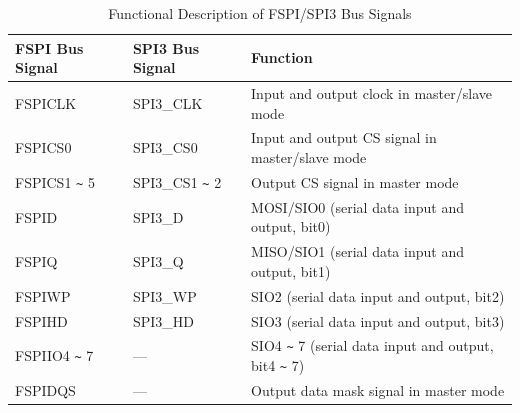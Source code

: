 \documentclass[main\_\_EN.tex]{subfiles}
\begin{document}
\begin{ThreePartTable}


\begin{longtable}[c]{|l|l|l|}
\caption{Functional Description of FSPI/SPI3 Bus Signals}
\label{table:SPI_signals}\\
\hline
    \rowcolor{lightgray}
    \textbf{FSPI Bus Signal}& \textbf{SPI3 Bus Signal}& \textbf{Function} \\
    \hline
    \endfirsthead

    \endlastfoot
    FSPICLK     & SPI3\_CLK     & Input and output clock in master/slave mode \\\hline
    FSPICS0     & SPI3\_CS0     & Input and output CS signal in master/slave mode \\\hline
    FSPICS1  \verb+~+ 5 & SPI3\_CS1 \verb+~+ 2  & Output CS signal in master mode\\\hline
    FSPID       & SPI3\_D       & MOSI/SIO0 (serial data input and output, bit0)\\
    \hline
    FSPIQ       & SPI3\_Q       & MISO/SIO1 (serial data input and output, bit1) \\\hline
    FSPIWP      & SPI3\_WP      & SIO2 (serial data input and output, bit2) \\\hline
    FSPIHD      & SPI3\_HD      & SIO3 (serial data input and output, bit3) \\\hline
    FSPIIO4 \verb+~+ 7 &    ---   & SIO4 \verb+~+ 7 (serial data input and output, bit4 \verb+~+ 7) \\\hline
    FSPIDQS     & ---             & Output data mask signal in master mode  \\\hline

\end{longtable}

\end{ThreePartTable}
\end{document}
